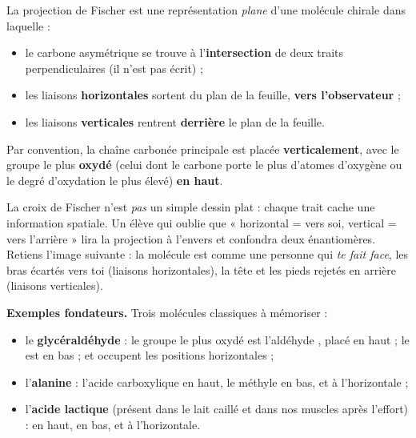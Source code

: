 \documentclass[11pt]{article}
\newcommand{\cle}[1]{{\popxbold\color{popdark}#1}}
\begin{document}
\begin{definition}
La \cle{projection de Fischer} est une représentation \emph{plane} d'une molécule chirale dans laquelle :
\begin{itemize}
\item le \cle{carbone asymétrique} se trouve à l'\textbf{intersection} de deux traits perpendiculaires (il n'est pas écrit) ;
\item les liaisons \textbf{horizontales} sortent du plan de la feuille, \textbf{vers l'observateur} ;
\item les liaisons \textbf{verticales} rentrent \textbf{derrière} le plan de la feuille.
\end{itemize}
Par convention, la chaîne carbonée principale est placée \textbf{verticalement}, avec le groupe le plus \textbf{oxydé} (celui dont le carbone porte le plus d'atomes d'oxygène ou le degré d'oxydation le plus élevé) \textbf{en haut}.
\end{definition}

\begin{attention}
La croix de Fischer n'est \emph{pas} un simple dessin plat : chaque trait cache une information spatiale. Un élève qui oublie que « horizontal = vers soi, vertical = vers l'arrière » lira la projection à l'envers et confondra deux énantiomères. Retiens l'image suivante : la molécule est comme une personne qui \emph{te fait face}, les bras écartés vers toi (liaisons horizontales), la tête et les pieds rejetés en arrière (liaisons verticales).
\end{attention}

\textbf{Exemples fondateurs.} Trois molécules classiques à mémoriser :

\begin{itemize}
\item le \textbf{glycéraldéhyde}  : le groupe le plus oxydé est l'aldéhyde , placé en haut ; le  est en bas ;  et  occupent les positions horizontales ;
\item l'\textbf{alanine}  : l'acide carboxylique  en haut, le méthyle  en bas,  et  à l'horizontale ;
\item l'\textbf{acide lactique}  (présent dans le lait caillé et dans nos muscles après l'effort) :  en haut,  en bas,  et  à l'horizontale.
\end{itemize}
\end{document}
